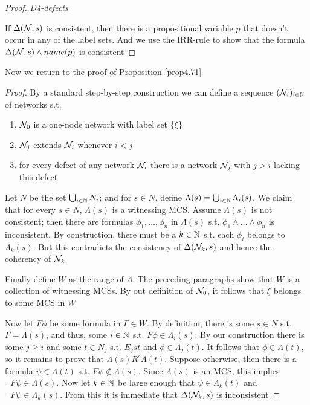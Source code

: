 \documentclass[11pt]{article}
\begin{document}
\begin{proof}
\emph{D4-defects}

If \(\Delta(\mathcal{N},s)\) is consistent, then there is a propositional variable
\(p\) that doesn't occur in any of the label sets. And we use the IRR-rule to
show that the formula \(\Delta(\mathcal{N},s)\wedge name(p)\) is consistent
\end{proof}

Now we return to the proof of Proposition \ref{prop4.71}
\begin{proof}
By a standard step-by-step construction we can define a sequence
\((\mathcal{N}_i)_{i\in\mathbb{N}}\) of networks s.t.
\begin{enumerate}
\item \(\mathcal{N}_0\) is a one-node network with label set \(\{\xi\}\)
\item \(\mathcal{N}_j\) extends \(\mathcal{N}_i\) whenever \(i<j\)
\item for every defect of any network \(\mathcal{N}_i\) there is a network \(\mathcal{N}_j\)
with \(j>i\) lacking this defect
\end{enumerate}


Let \(N\) be the set \(\bigcup_{i\in\mathbb{N}}N_i\); and for \(s\in N\), define
\(\Lambda(s)=\bigcup_{i\in\mathbb{N}}\Lambda_i(s)\). We claim that for every \(s\in N\),
\(\Lambda(s)\) is a witnessing MCS. Assume \(\Lambda(s)\) is not consistent; then there
are formulas \(\phi_1,\dots,\phi_n\) in \(\Lambda(s)\) s.t.
\(\phi_1\wedge\dots\wedge\phi_n\) is inconsistent. By construction, there
must be a \(k\in\mathbb{N}\) s.t. each \(\phi_i\) belongs to \(\Lambda_k(s)\). But
this contradicts the consistency of \(\Delta(\mathcal{N}_k,s)\) and hence the coherency
of \(\mathcal{N}_k\)

Finally define \(W\) as the range of \(\Lambda\). The preceding paragraphs show that
\(W\) is a collection of witnessing MCSs. By out definition of \(\mathcal{N}_0\),
it follows that \(\xi\) belongs to some MCS in \(W\)

Now let \(F\phi\) be some formula in \(\Gamma\in W\). By definition, there is
some \(s\in N\) s.t. \(\Gamma=\Lambda(s)\), and thus, some \(i\in\mathbb{N}\) s.t.
\(F\phi\in\Lambda_i(s)\). By our construction there is some \(j\ge i\) and
some \(t\in N_j\) s.t. \(E_jst\) and \(\phi\in\Lambda_j(t)\). It follows that
\(\phi\in\Lambda(t)\), so it remains to prove that \(\Lambda(s)R^c\Lambda(t)\).
Suppose otherwise, then there is a formula \(\psi\in\Lambda(t)\) s.t.
\(F\psi\not\in\Lambda(s)\). Since \(\Lambda(s)\) is an MCS, this implies \(\neg
   F\psi\in\Lambda(s)\). Now let \(k\in\mathbb{N}\) be large enough that
\(\psi\in\Lambda_k(t)\) and \(\neg F\psi\in\Lambda_k(s)\). From this it is
immediate that \(\Delta(\mathcal{N}_k,s)\) is inconsistent
\end{proof}
\end{document}
